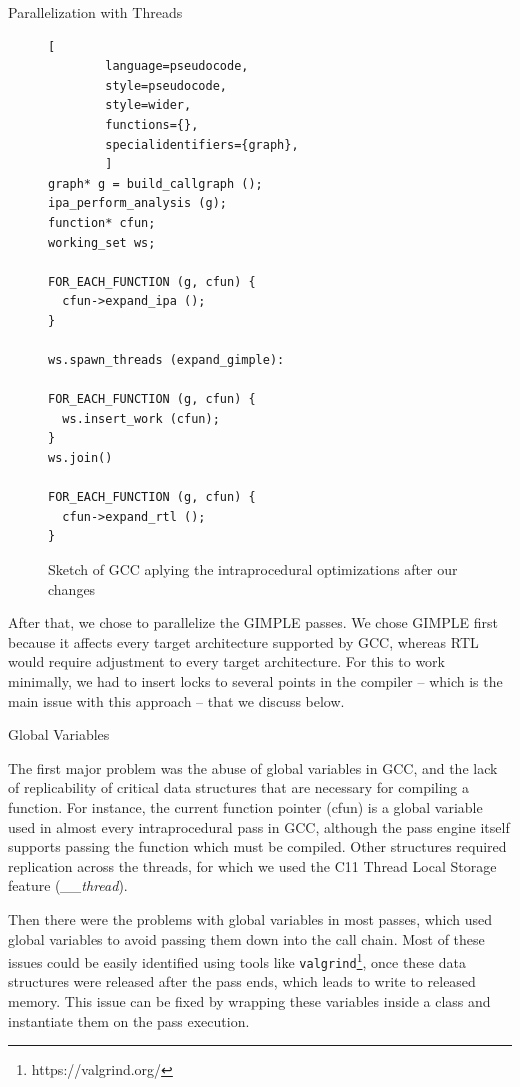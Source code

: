 \begin{section}{Parallelization with Threads}
\begin{figure}[ht]
	\begin{center}
	\begin{lstlisting}[
		language=pseudocode,
		style=pseudocode,
		style=wider,
		functions={},
		specialidentifiers={graph},
		]
graph* g = build_callgraph ();
ipa_perform_analysis (g);
function* cfun;
working_set ws;

FOR_EACH_FUNCTION (g, cfun) {
  cfun->expand_ipa ();
}

ws.spawn_threads (expand_gimple):

FOR_EACH_FUNCTION (g, cfun) {
  ws.insert_work (cfun);
}
ws.join()

FOR_EACH_FUNCTION (g, cfun) {
  cfun->expand_rtl ();
}
	\end{lstlisting}
	\end{center}
\caption{Sketch of GCC aplying the intraprocedural optimizations after our changes}
\label{fig:intraprocedural_sketch_after}
\end{figure}

After that, we chose to parallelize the GIMPLE passes. We chose GIMPLE first
because it affects every target architecture supported by GCC, whereas RTL
would require adjustment to every target architecture. For this to work
minimally, we had to insert locks to several points in the compiler -- which is
the main issue with this approach -- that we discuss below.

\begin{subsection}{Global Variables}

The first major problem was the abuse of global variables in GCC, and the lack
of replicability of critical data structures that are necessary for compiling a
function. For instance, the current function pointer (cfun) is a global
variable used in almost every intraprocedural pass in GCC, although the pass
engine itself supports passing the function which must be compiled. Other
structures required replication across the threads, for which we used the C11
Thread Local Storage feature (\textit{\_\_thread}).

Then there were the problems with global variables in most passes, which used
global variables to avoid passing them down into the call chain. Most of these
issues could be easily identified using tools like
\texttt{valgrind}\footnote{https://valgrind.org/}, once these data structures
were released after the pass ends, which leads to write to released memory.
This issue can be fixed by wrapping these variables inside a class and
instantiate them on the pass execution.


\end{subsection}
\end{section}
